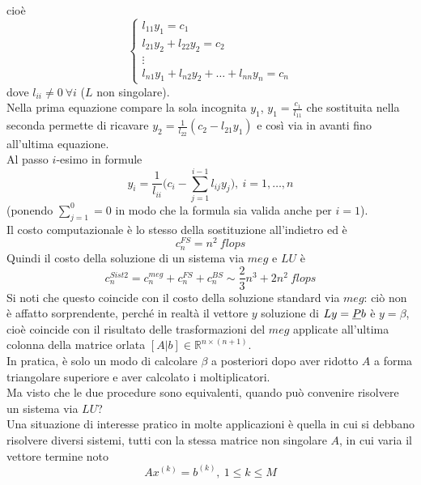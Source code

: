 \documentclass[12pt,a4paper]{article}
\begin{document}
cioè
\begin{equation*}
    \begin{cases}
    l_{11}y_1 = c_1\\ 
    l_{21}y_2 + l_{22}y_2 = c_2 \\ 
    \vdots\\ 
    l_{n1}y_1 +l_{n2}y_2 + \dots + l_{nn}y_{n} = c_n
\end{cases}
\end{equation*}
dove $l_{ii}\neq 0 \ \forall i$ ($L$ non singolare). \\
Nella prima equazione compare la sola incognita $y_1$, $y_1 = \frac{c_1}{l_{11}}$ che sostituita nella seconda permette di ricavare $y_2=\frac{1}{l_{22}}(c_2 - l_{21}y_1)$ e così via in avanti fino all'ultima equazione. \\
Al passo $i$-esimo in formule
\begin{equation*}
    y_i = \frac{1}{l_{ii}}\biggl( c_i - \sum_{j=1}^{i-1} l_{ij}y_j \biggr), \ i=1,\dots,n
\end{equation*}
(ponendo $\sum_{j=1}^0 = 0$ in modo che la formula sia valida anche per $i=1$).\\
Il costo computazionale è lo stesso della sostituzione all'indietro ed è 
\begin{equation*}
    c_n^{FS} = n^2 \ flops
\end{equation*}
Quindi il costo della soluzione di un sistema via $meg$ e $LU$ è 
\begin{equation*}
    c_n^{Sist2} = c_n^{meg} + c_n^{FS} + c_n^{BS} \sim \frac{2}{3}n^3 + 2n^2 \ flops
\end{equation*}
Si noti che questo coincide con il costo della soluzione standard via $meg$: ciò non è affatto sorprendente, perché in realtà il vettore $y$ soluzione di $Ly = \uline{P}b$ è $y=\beta$, cioè coincide con il risultato delle trasformazioni del $meg$ applicate all'ultima colonna della matrice orlata $[A|b]\in \mathbb{R}^{n\times (n+1)}$. \\
In pratica, è solo un modo di calcolare $\beta$ a posteriori dopo aver ridotto $A$ a forma triangolare superiore e aver calcolato i moltiplicatori.\\
Ma visto che le due procedure sono equivalenti, quando può convenire risolvere un sistema via $LU$? \\
Una situazione di interesse pratico in molte applicazioni è quella in cui si debbano risolvere diversi sistemi, tutti con la stessa matrice non singolare $A$, in cui varia il vettore termine noto
\begin{equation*}
    Ax^{(k)} = b^{(k)}, \ 1 \leq k \leq M
\end{equation*}
\end{document}
